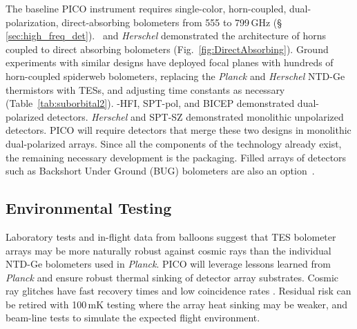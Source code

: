 The baseline PICO instrument requires single-color, horn-coupled, dual-polarization, direct-absorbing bolometers from 555 to 799\,GHz (\S\,\ref{sec:high_freq_det}).  \planck\ and \textit{Herschel} demonstrated the architecture of horns coupled to direct absorbing bolometers (Fig.~\ref{fig:DirectAbsorbing}).    Ground experiments with similar designs have deployed focal planes with hundreds of horn-coupled spiderweb bolometers, replacing the \textit{Planck} and \textit{Herschel} NTD-Ge thermistors with TESs, and adjusting time constants as necessary (Table~\ref{tab:suborbital2}). \planck -HFI, SPT-pol, and BICEP demonstrated dual-polarized detectors. \textit{Herschel} and SPT-SZ demonstrated monolithic unpolarized detectors. PICO will require detectors that merge these two designs in monolithic dual-polarized arrays. Since all the components of the technology already exist, the remaining necessary development is the packaging. Filled arrays of detectors such as Backshort Under Ground (BUG) bolometers are also an option~\citep{Staguhn2006}.




\subsection{Environmental Testing}
\label{sec:env_testing}


Laboratory tests and in-flight data from balloons suggest that TES
bolometer arrays may be more naturally robust against cosmic rays than
the individual NTD-Ge bolometers used in \textit{Planck}. PICO will leverage lessons
learned from \textit{Planck} and ensure robust thermal sinking of
detector array substrates. Cosmic ray
glitches have fast recovery times and low coincidence rates
\citep{SPIDER2018,Filippini_inprep}. Residual risk can be retired with 100\,mK
testing where the array heat sinking may be weaker, and beam-line
tests to simulate the expected flight environment.

